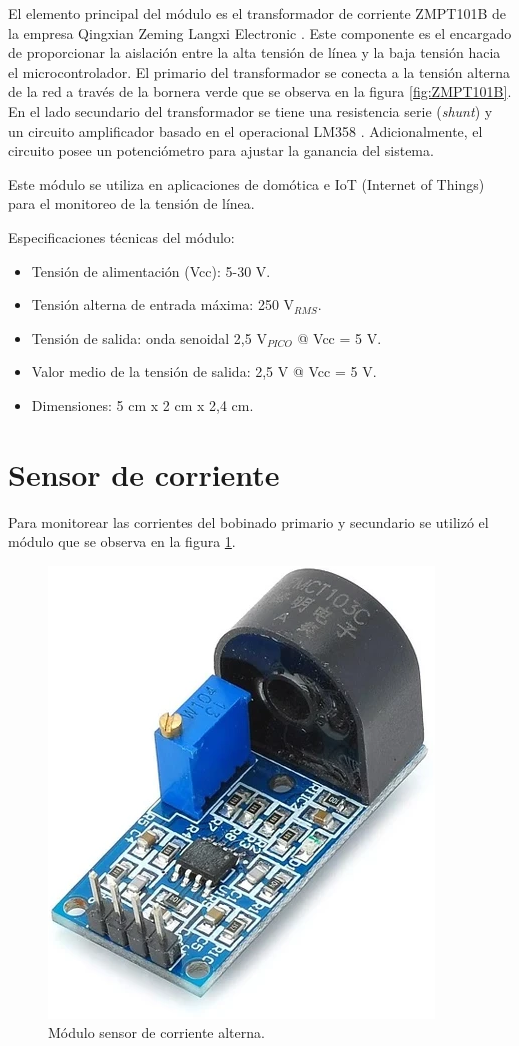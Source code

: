 El elemento principal del módulo es el transformador de corriente ZMPT101B de la empresa Qingxian Zeming Langxi Electronic \citep{ZMPT101B_b}. Este componente es el encargado de proporcionar la aislación entre la alta tensión de línea y la baja tensión hacia el microcontrolador. El primario del transformador se conecta a la tensión alterna de la red a través de la bornera verde que se observa en la figura \ref{fig:ZMPT101B}. En el lado secundario del transformador se tiene una resistencia serie (\textit{shunt}) y un circuito amplificador basado en el operacional LM358 \citep{LM358}. Adicionalmente, el circuito posee un potenciómetro para ajustar la ganancia del sistema.

Este módulo se utiliza en aplicaciones de domótica e IoT (Internet of Things) para el monitoreo de la tensión de línea.

Especificaciones técnicas del módulo: 
\begin{itemize}
\item Tensión de alimentación (Vcc): 5-30 V.
\item Tensión alterna de entrada máxima: 250 V$_{RMS}$.
\item Tensión de salida: onda senoidal 2,5 V$_{PICO}$ @ Vcc = 5 V.
\item Valor medio de la tensión de salida: 2,5 V @ Vcc = 5 V.
\item Dimensiones: 5 cm x 2 cm x 2,4 cm.
\end{itemize}

\section{Sensor de corriente}
\label{sec:secZMCT103C}

Para monitorear las corrientes del bobinado primario y secundario se utilizó el módulo que se observa en la figura \ref{fig:ZMCT103C}.

\begin{figure}[htpb]
	\centering
	\includegraphics[scale=.5]{./Figures/ZMCT103C.png}
	\caption{Módulo sensor de corriente alterna.}
	\label{fig:ZMCT103C}
\end{figure}

